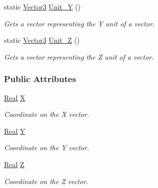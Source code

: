 \begin{DoxyCompactItemize}
static \hyperlink{classphys_1_1Vector3}{Vector3} \hyperlink{classphys_1_1Vector3_ab9d8ea65d744278a87aeeeea059d5895}{Unit\_\-Y} ()
\begin{DoxyCompactList}\small\item\em Gets a vector representing the Y unit of a vector. \item\end{DoxyCompactList}\item 
static \hyperlink{classphys_1_1Vector3}{Vector3} \hyperlink{classphys_1_1Vector3_a9c25ec99cf982fe28eeaff4ddfc67715}{Unit\_\-Z} ()
\begin{DoxyCompactList}\small\item\em Gets a vector representing the Z unit of a vector. \item\end{DoxyCompactList}\end{DoxyCompactItemize}
\subsubsection*{Public Attributes}
\begin{DoxyCompactItemize}
\item 
\hypertarget{classphys_1_1Vector3_a23660f9d1e21a25c53aa06aa737bb56b}{
\hyperlink{namespacephys_af7eb897198d265b8e868f45240230d5f}{Real} \hyperlink{classphys_1_1Vector3_a23660f9d1e21a25c53aa06aa737bb56b}{X}}
\label{classphys_1_1Vector3_a23660f9d1e21a25c53aa06aa737bb56b}

\begin{DoxyCompactList}\small\item\em Coordinate on the X vector. \item\end{DoxyCompactList}\item 
\hypertarget{classphys_1_1Vector3_a6c9bc2ab0995d5056dba8272c650e58e}{
\hyperlink{namespacephys_af7eb897198d265b8e868f45240230d5f}{Real} \hyperlink{classphys_1_1Vector3_a6c9bc2ab0995d5056dba8272c650e58e}{Y}}
\label{classphys_1_1Vector3_a6c9bc2ab0995d5056dba8272c650e58e}

\begin{DoxyCompactList}\small\item\em Coordinate on the Y vector. \item\end{DoxyCompactList}\item 
\hypertarget{classphys_1_1Vector3_a53c84fa4b38fb9c4a4d822b04c200b13}{
\hyperlink{namespacephys_af7eb897198d265b8e868f45240230d5f}{Real} \hyperlink{classphys_1_1Vector3_a53c84fa4b38fb9c4a4d822b04c200b13}{Z}}
\label{classphys_1_1Vector3_a53c84fa4b38fb9c4a4d822b04c200b13}

\begin{DoxyCompactList}\small\item\em Coordinate on the Z vector. \item\end{DoxyCompactList}\end{DoxyCompactItemize}


